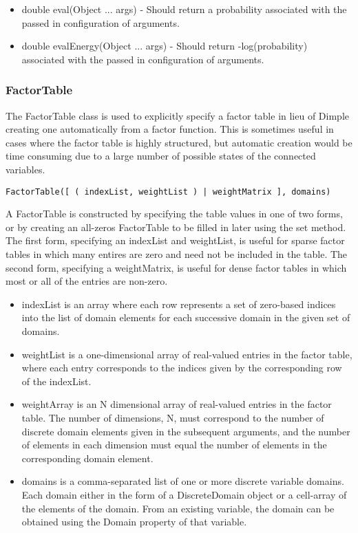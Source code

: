 \begin{itemize}
\item double eval(Object ... args) - Should return a probability associated with the passed in configuration of arguments.
\item double evalEnergy(Object ... args) - Should return -log(probability) associated with the passed in configuration of arguments.
\end{itemize}

\fi

\subsubsection{FactorTable}
\label{sec:FactorTable}

The FactorTable class is used to explicitly specify a factor table in lieu of Dimple creating one automatically from a factor function.  This is sometimes useful in cases where the factor table is highly structured, but automatic creation would be time consuming due to a large number of possible states of the connected variables.


\ifmatlab
\begin{lstlisting}
FactorTable([ ( indexList, weightList ) | weightMatrix ], domains)
\end{lstlisting}

A FactorTable is constructed by specifying the table values in one of two forms, or by creating an all-zeros FactorTable to be filled in later using the set method.  The first form, specifying an indexList and weightList, is useful for sparse factor tables in which many entires are zero and need not be included in the table.  The second form, specifying a weightMatrix, is useful for dense factor tables in which most or all of the entries are non-zero.


\begin{itemize}
\item indexList is an array where each row represents a set of zero-based indices into the list of domain elements for each successive domain in the given set of domains.
\item weightList is a one-dimensional array of real-valued entries in the factor table, where each entry corresponds to the indices given by the corresponding row of the indexList.
\item weightArray is an N dimensional array of real-valued entries in the factor table.  The number of dimensions, N, must correspond to the number of discrete domain elements given in the subsequent arguments, and the number of elements in each dimension must equal the number of elements in the corresponding domain element.
\item domains is a comma-separated list of one or more discrete variable domains.  Each domain either in the form of a DiscreteDomain object or a cell-array of the elements of the domain.  From an existing variable, the domain can be obtained using the Domain property of that variable.
\end{itemize}

